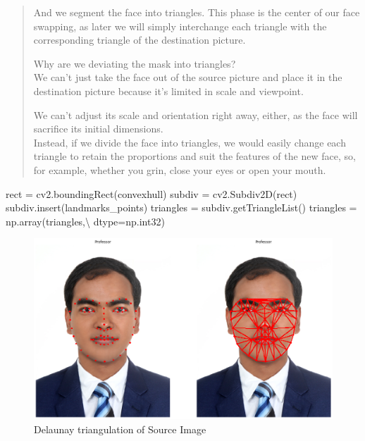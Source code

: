 \documentclass[12pt, a4paper, twocolumn]{article}
\newenvironment{Shaded}{}{}
\newcommand{\OperatorTok}[1]{\textcolor[rgb]{0.40,0.40,0.40}{#1}}
\newcommand{\NormalTok}[1]{#1}
\begin{document}
\begin{quote}
	And we segment the face into triangles. This phase is the center of our
	face swapping, as later we will simply interchange each triangle with
	the corresponding triangle of the destination picture.
	
	Why are we deviating the mask into triangles?\\
	We can't just take the face out of the source picture and place it in
	the destination picture because it's limited in scale and viewpoint.
	
	We can't adjust its scale and orientation right away, either, as the
	face will sacrifice its initial dimensions.\\
	Instead, if we divide the face into triangles, we would easily change
	each triangle to retain the proportions and suit the features of the new
	face, so, for example, whether you grin, close your eyes or open your
	mouth.
\end{quote}

\begin{Shaded}
\small
\begin{Highlighting}[]
\NormalTok{rect }\OperatorTok{=}\NormalTok{ cv2.boundingRect(convexhull)}
\NormalTok{subdiv }\OperatorTok{=}\NormalTok{ cv2.Subdiv2D(rect)}
\NormalTok{subdiv.insert(landmarks_points)}
\NormalTok{triangles }\OperatorTok{=}\NormalTok{ subdiv.getTriangleList()}
\NormalTok{triangles }\OperatorTok{=}\NormalTok{ np.array(triangles,}\OperatorTok{\textbackslash{}}
\NormalTok{ dtype}\OperatorTok{=}\NormalTok{np.int32)}
\end{Highlighting}
\end{Shaded}

\begin{figure}
	\centering
	\includegraphics{meta/output_32_0.png}
	\caption{Delaunay triangulation of Source Image}
\end{figure}
\end{document}
